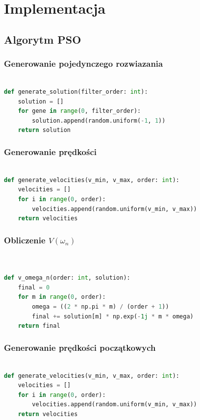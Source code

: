 \documentclass[eng, pl, oneside, openright, final, openbib]{mgr}\DeclareUnicodeCharacter{0301}{\'{e}}
\begin{document}
\chapter{Implementacja}
\section{Algorytm PSO}
\subsection{Generowanie pojedynczego rozwiazania}
\begin{lstlisting}[language=Python, caption=Implementacja stworzenia pojedynczego rozwiązania]

def generate_solution(filter_order: int):
    solution = []
    for gene in range(0, filter_order):
        solution.append(random.uniform(-1, 1))
    return solution
\end{lstlisting}
\subsection{Generowanie prędkości}
\begin{lstlisting}[language=Python, caption=Generowanie prędkości]

def generate_velocities(v_min, v_max, order: int):
    velocities = []
    for i in range(0, order):
        velocities.append(random.uniform(v_min, v_max))
    return velocities
\end{lstlisting}

\subsection{Obliczenie $ V(\omega_{n})$}
\begin{lstlisting}[language=Python, caption=Implementacja równania Obliczenie $ V(\omega_{n})$]


def v_omega_n(order: int, solution):
    final = 0
    for m in range(0, order):
        omega = ((2 * np.pi * m) / (order + 1))
        final += solution[m] * np.exp(-1j * m * omega)
    return final
\end{lstlisting}
\subsection{Generowanie prędkości początkowych}
\begin{lstlisting}[language=Python, caption=Implementacja funkcji generuącej prędkośi dla każdej cząsteczki]

def generate_velocities(v_min, v_max, order: int):
    velocities = []
    for i in range(0, order):
        velocities.append(random.uniform(v_min, v_max))
    return velocities
\end{lstlisting}
\end{document}
